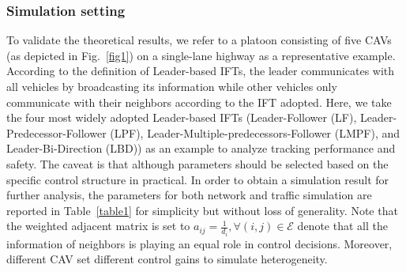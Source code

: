 \documentclass[a4paper]{cas-sc}
\begin{document}
\subsubsection{Simulation setting}
\label{Section 5.1.1}
To validate the theoretical results, we refer to a platoon consisting of five CAVs (as depicted in Fig.~\ref{fig1}) on a single-lane highway as a representative example. According to the definition of Leader-based IFTs, the leader communicates with all vehicles by broadcasting its information while other vehicles only communicate with their neighbors according to the IFT adopted. Here, we take the four most widely adopted Leader-based IFTs (Leader-Follower (LF), Leader-Predecessor-Follower (LPF), Leader-Multiple-predecessors-Follower (LMPF), and Leader-Bi-Direction (LBD)) as an example to analyze tracking performance and safety. The caveat is that although parameters should be selected based on the specific control structure in practical. In order to obtain a simulation result for further analysis, the parameters for both network and traffic simulation are reported in Table~\ref{table1} for simplicity but without loss of generality. Note that the weighted adjacent matrix is set to ${a_{ij}} = \frac{1}{{{d_i}}},\forall (i,j) \in \mathcal{E}$ denote that all the information of neighbors is playing an equal role in control decisions. Moreover, different CAV set different control gains to simulate heterogeneity.
\end{document}
